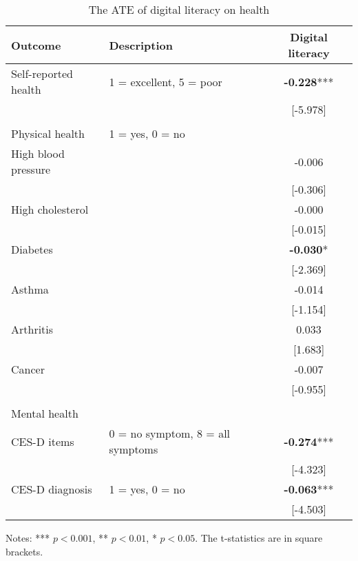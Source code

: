 \documentclass[11pt]{article}
\begin{document}
    \begin{table}[h!]
        \centering
        \caption{The ATE of digital literacy on health}
        \label{tab:ate}
        \begin{threeparttable}
            \begin{tabular}{llc}
                \toprule
                Outcome & Description & Digital literacy \\
                \midrule
                Self-reported health & 1 = excellent, 5 = poor & \textbf{-0.228}*** \\
                & & [-5.978] \\
                & & \\
                Physical health & 1 = yes, 0 = no & \\
                High blood pressure & & -0.006 \\
                & & [-0.306] \\
                High cholesterol & & -0.000 \\
                & & [-0.015] \\
                Diabetes & & \textbf{-0.030}* \\
                & & [-2.369] \\
                Asthma & & -0.014 \\
                & & [-1.154] \\
                Arthritis & & 0.033 \\
                & & [1.683] \\
                Cancer & & -0.007 \\
                & & [-0.955] \\
                & & \\
                Mental health & & \\
                CES-D items & 0 = no symptom, 8 = all symptoms & \textbf{-0.274}*** \\
                & & [-4.323] \\
                CES-D diagnosis & 1 = yes, 0 = no & \textbf{-0.063}*** \\
                & & [-4.503] \\
                \bottomrule
            \end{tabular}
            \begin{tablenotes}
                \footnotesize
                \item Notes: *** $p < 0.001$, ** $p < 0.01$, * $p < 0.05$. The t-statistics are in square brackets.
            \end{tablenotes}
        \end{threeparttable}
    \end{table}
\end{document}
